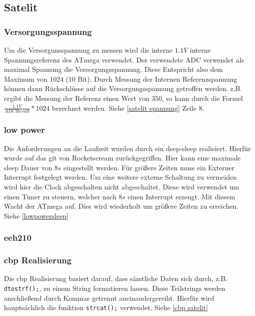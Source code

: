 \subsection{Satelit}

\subsubsection{Versorgungsspannung}
Um die Versorgunsspannung zu messen wird die interne $1.1V$ interne Spannungsreferenz des ATmega verwendet. Der verwendete ADC verwendet als maximal Spannung die Versorgungsspannung. Diese Entspricht also dem Maximum von 1024 (10 Bit). Durch Messung der Internen Referenzspannung können dann Rückschlüsse auf die Versorgungsspannung getroffen werden. 
z.B. ergibt die Messung der Referenz einen Wert von $350$, so kann durch die Formel $\frac{1.1V}{ADC Result} * 1024$ berechnet werden. Siehe \ref{satelit spannung} Zeile 8.
\subsubsection{low power}
Die Anforderungen an die Laufzeit wurden durch ein \grqq deep-sleep \grqq realisiert. Hierfür wurde auf das git von Rocketscream zurückgegriffen\cite{lowpower}. Hier kann eine maximale sleep Dauer von $8s$ eingestellt werden. Für größere Zeiten muss ein Externer Interrupt festgelegt werden. Um eine weitere externe Schaltung zu vermeiden wird hier die Clock abgeschalten nicht abgeschaltet. Diese wird verwendet um einen Timer zu steuern, welcher nach $8s$ einen Interrupt erzeugt. Mit diesem Wacht der ATmega auf. Dies wird wiederholt um größere Zeiten zu erreichen. Siehe \ref{lowpowersleep}
\subsubsection{eeh210}

\subsubsection{cbp Realisierung}
Die cbp Realisierung basiert darauf, dass sämtliche Daten sich durch, z.B. \texttt{dtostrf();}, zu einem String formatieren lassen. Diese Teilstrings werden anschließend durch Kommas getrennt aneinandergereiht. Hierfür wird hauptsächlich die funktion \texttt{strcat();} verwendet. Siehe \ref{cbp satelit}